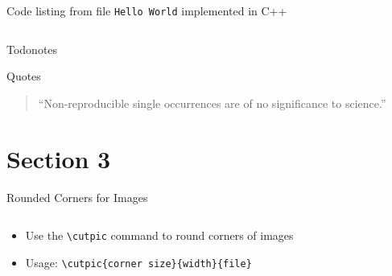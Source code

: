 \documentclass[compress,aspectratio=169]{beamer}
\begin{document}
\begin{frame}[fragile]{Code listing from file}
    \texttt{Hello World} implemented in C++

    \begin{tcolorbox}[title=C++]
        \footnotesize\inputminted[xleftmargin=1em,linenos]{c++}{assets/hello-world.cpp}
    \end{tcolorbox}

\end{frame}

\begin{frame}{Todonotes}
\end{frame}

\begin{frame}{Quotes}
    \vspace*{\fill}
    \begin{quote}
        \centering\Large
        \enquote{Non-reproducible single occurrences are of no significance to science.}
    \end{quote}
    \vspace{1cm}
    \hspace*{}
    \vspace*{\fill}

\end{frame}


\section{Section 3}

\begin{frame}{Rounded Corners for Images}
	\begin{columns}
		\begin{column}{0.5\textwidth}
			\begin{itemize}
				\item Use the \texttt{\textbackslash cutpic} command to round corners of images
				\item Usage: \texttt{\textbackslash cutpic\{corner size\}\{width\}\{file\}}
			\end{itemize}
		\end{column}
		\begin{column}{0.5\textwidth}
			\vspace*{-0.2cm}
		\end{column}
	\end{columns}
\end{frame}
\end{document}
